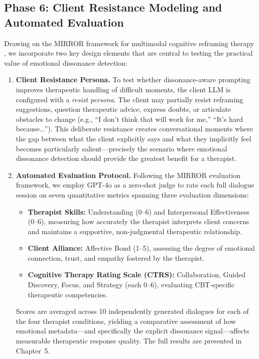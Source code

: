 \subsection{Phase 6: Client Resistance Modeling and Automated Evaluation}

Drawing on the MIRROR framework for multimodal cognitive reframing therapy \cite{kim-etal-2025-mirror}, we incorporate two key design elements that are central to testing the practical value of emotional dissonance detection:

\begin{enumerate}
    \item \textbf{Client Resistance Persona.}
    To test whether dissonance-aware prompting improves therapeutic handling of difficult moments, the client LLM is configured with a \emph{resist persona}. The client may partially resist reframing suggestions, question therapeutic advice, express doubts, or articulate obstacles to change (e.g., ``I don't think that will work for me,'' ``It's hard because...''). This deliberate resistance creates conversational moments where the gap between what the client explicitly says and what they implicitly feel becomes particularly salient---precisely the scenario where emotional dissonance detection should provide the greatest benefit for a therapist.
    
    \item \textbf{Automated Evaluation Protocol.}
    Following the MIRROR evaluation framework, we employ GPT-4o as a zero-shot judge to rate each full dialogue session on seven quantitative metrics spanning three evaluation dimensions:
    \begin{itemize}
        \item \textbf{Therapist Skills:} Understanding (0--6) and Interpersonal Effectiveness (0--6), measuring how accurately the therapist interprets client concerns and maintains a supportive, non-judgmental therapeutic relationship.
        \item \textbf{Client Alliance:} Affective Bond (1--5), assessing the degree of emotional connection, trust, and empathy fostered by the therapist.
        \item \textbf{Cognitive Therapy Rating Scale (CTRS):} Collaboration, Guided Discovery, Focus, and Strategy (each 0--6), evaluating CBT-specific therapeutic competencies.
    \end{itemize}
    Scores are averaged across 10 independently generated dialogues for each of the four therapist conditions, yielding a comparative assessment of how emotional metadata---and specifically the explicit dissonance signal---affects measurable therapeutic response quality. The full results are presented in Chapter~5.
\end{enumerate}




